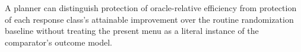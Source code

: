 A planner can distinguish protection of oracle-relative efficiency from protection of each response class's attainable improvement over the routine randomization baseline without treating the present menu as a literal instance of the comparator's outcome model.
